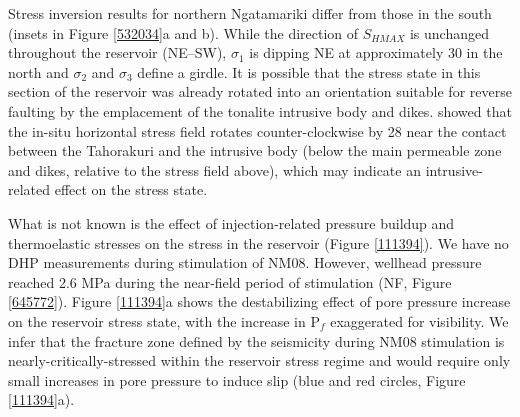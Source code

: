 Stress inversion results for northern Ngatamariki differ from those in the south (insets in Figure \ref{532034}a and b). While the direction of $S_{HMAX}$ is unchanged throughout the reservoir (NE--SW), $\sigma_1$ is dipping NE at approximately 30\textdegree{} in the north and $\sigma_2$ and $\sigma_3$ define a girdle. It is possible that the stress state in this section of the reservoir was already rotated into an orientation suitable for reverse faulting by the emplacement of the tonalite intrusive body and dikes. \citet{massiot_2012} showed that the in-situ horizontal stress field rotates counter-clockwise by 28\textdegree{} near the contact between the Tahorakuri and the intrusive body (below the main permeable zone and dikes, relative to the stress field above), which may indicate an intrusive-related effect on the stress state.

What is not known is the effect of injection-related pressure buildup and thermoelastic stresses on the stress in the reservoir (Figure \ref{111394}). We have no DHP measurements during stimulation of NM08. However, wellhead pressure reached 2.6 MPa during the near-field period of stimulation (NF, Figure \ref{645772}). Figure \ref{111394}a shows the destabilizing effect of pore pressure increase on the reservoir stress state, with the increase in P$_f$ exaggerated for visibility. We infer that the fracture zone defined by the seismicity during NM08 stimulation is nearly-critically-stressed within the reservoir stress regime and would require only small increases in pore pressure to induce slip (blue and red circles, Figure \ref{111394}a).

